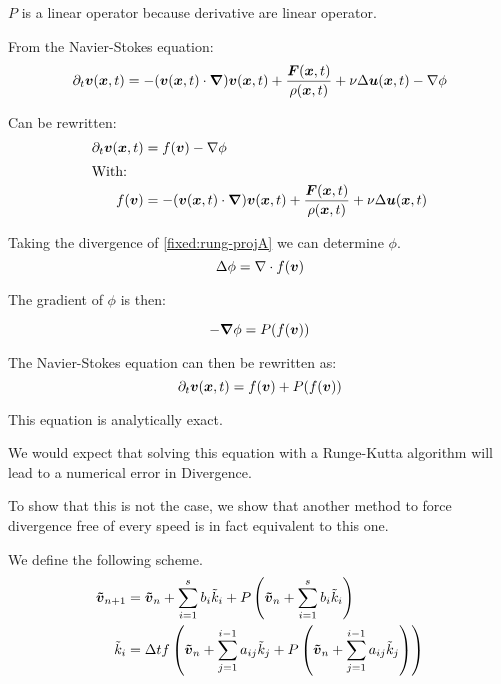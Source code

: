 $P$ is a linear operator because derivative are linear operator.
 
 From the Navier-Stokes equation:
 \begin{equation}
   \partial_t {\boldsymbol {v}}({\boldsymbol {x}} ,t)=-({\boldsymbol {v}}({\boldsymbol {x}},t)\cdot{\boldsymbol {\nabla}} ) {\boldsymbol {v}}({\boldsymbol {x}} ,t)+\frac{{\boldsymbol {F}}({\boldsymbol {x}},t)}{\rho({\boldsymbol {x}},t)}+\nu \Delta {\boldsymbol {u}}({\boldsymbol {x}},t)-\nabla \phi
 \end{equation}

 Can be rewritten:
 \begin{align}
 \label{fixed:rung-projA}
  \partial_t {\boldsymbol {v}}({\boldsymbol {x}} ,t)&=f({\boldsymbol {v}})-\nabla \phi \\
  \intertext{With:}
  f({\boldsymbol {v}})&=-({\boldsymbol {v}}({\boldsymbol {x}},t)\cdot{\boldsymbol {\nabla}} ) {\boldsymbol {v}}({\boldsymbol {x}} ,t)+\frac{{\boldsymbol {F}}({\boldsymbol {x}},t)}{\rho({\boldsymbol {x}},t)}+\nu \Delta {\boldsymbol {u}}({\boldsymbol {x}},t)
 \end{align}
 
 Taking the divergence of \ref{fixed:rung-projA} we can determine $\phi$.
 \begin{equation}
  \Delta \phi=\nabla \cdot f({\boldsymbol {v}})
 \end{equation}

 The gradient of $\phi$ is then:
 
 \begin{equation}
  -{\boldsymbol {\nabla}}\phi=P(f({\boldsymbol {v}}))
 \end{equation}

 The Navier-Stokes equation can then be rewritten as:
 \begin{equation}\label{fixed:simpl_navier}
 \partial_t {\boldsymbol {v}}({\boldsymbol {x}} ,t)=f({\boldsymbol {v}})+P(f({\boldsymbol {v}})) 
\end{equation}

This equation is analytically exact.

We would expect that solving this equation with a Runge-Kutta algorithm will lead to a numerical error in Divergence.

To show that this is not the case, we show that another method to force divergence free of every speed is in fact equivalent to this one.

We define the following scheme.
\begin{align}
{\boldsymbol {\tilde{v}}}_{n+1}&={\boldsymbol {\tilde{v}}}_{n}+\sum_{i=1}^{s}b_{i}\tilde{k}_{i}+P\left({\boldsymbol {\tilde{v}}}_{n}+\sum_{i=1}^{s}b_{i}\tilde{k}_{i}\right)\\
\tilde{k}_{i}&=\Delta t f\left({\boldsymbol {\tilde{v}}}_{n}+\sum_{j=1}^{i-1}a_{ij}\tilde{k}_{j}+P\left({\boldsymbol {\tilde{v}}}_{n}+\sum_{j=1}^{i-1}a_{ij}\tilde{k}_{j}\right)\right)
\end{align}

